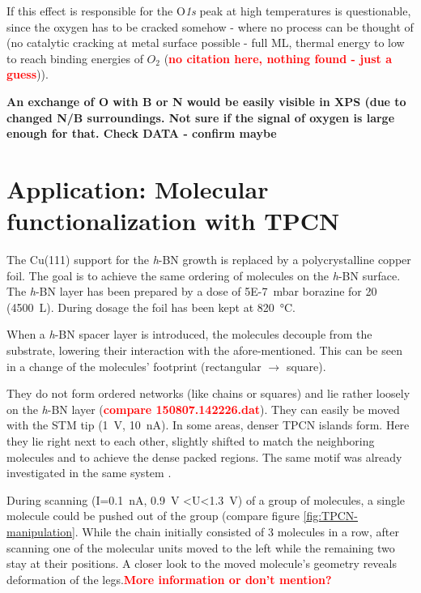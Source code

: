 If this effect is responsible for the O\textit{1s} peak at high temperatures is questionable, since the oxygen has to be cracked somehow - where no process can be thought of (no catalytic cracking at metal surface possible - full ML, thermal energy to low to reach binding energies of $O_2$ (\textcolor{red}{\textbf{no citation here, nothing found - just a guess}})).

\textbf{An exchange of O with B or N would be easily visible in XPS (due to changed N/B surroundings. Not sure if the signal of oxygen is large enough for that. Check DATA - confirm maybe}

  \section{Application: Molecular functionalization with TPCN}
  The Cu(111) support for the \textit{h}-BN growth is replaced by a polycrystalline copper foil. The goal is to achieve the same ordering of molecules on the \textit{h}-BN surface. The \textit{h}-BN layer has been prepared by a dose of \SI{5E-7}{\milli\bar} borazine for \SI{20}{\min} (\SI{4500}{\L}). During dosage the foil has been kept at \SI{820}{\celsius}.
  
  When a \textit{h}-BN spacer layer is introduced, the molecules decouple from the substrate, lowering their interaction with the afore-mentioned. This can be seen in a change of the molecules' footprint (rectangular $\rightarrow$ square).
  
  They do not form ordered networks (like chains or squares) and lie rather loosely on the \textit{h}-BN layer (\textcolor{red}{\textbf{compare 150807.142226.dat}}). They can easily be moved with the STM tip (\SI{1}{\volt}, \SI{10}{\nano \ampere}). In some areas, denser TPCN islands form. Here they lie right next to each other, slightly shifted to match the neighboring molecules and to achieve the dense packed regions. The same motif was already investigated in the same system \cite{urgel_controlling_2015}.
  
  During scanning (I=\SI{0.1}{\nA}, \SI{0.9}{\V} <U<\SI{1.3}{\V}) of a group of molecules, a single molecule could be pushed out of the group (compare figure \ref{fig:TPCN-manipulation}. While the chain initially consisted of 3 molecules in a row, after scanning one of the molecular units moved to the left while the remaining two stay at their positions. A closer look to the moved molecule's geometry reveals deformation of the legs.\textcolor{red}{\textbf{More information or don't mention?}}
  
